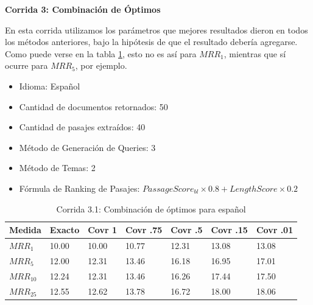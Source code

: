 \textbf{Corrida 3: Combinación de Óptimos}\newline

En esta corrida utilizamos los parámetros que mejores resultados dieron en todos los métodos anteriores, bajo la hipótesis de que el resultado debería agregarse. Como puede verse en la tabla \ref{table:optimos}, esto no es así para $MRR_1$, mientras que sí ocurre para $MRR_5$, por ejemplo. \newline


\begin{itemize}
  \item Idioma: Español
  \item Cantidad de documentos retornados: 50
  \item Cantidad de pasajes extraídos: 40
  \item Método de Generación de Queries: 3
  \item Método de Temas: 2
  \item Fórmula de Ranking de Pasajes:  $PassageScore_{bl} \times 0.8 + LengthScore \times 0.2$
\end{itemize}


\begin{table}[H]
\centering
\begin{center}
\begin{tabular}{|l | l | l | l | l | l | l |}
\hline
Medida & Exacto & Covr 1 & Covr .75 & Covr .5 & Covr .15 & Covr .01 \\ \hline
$MRR_{1}$ & 10.00 & 10.00 & 10.77 & 12.31 & 13.08 & 13.08  \\ \hline
$MRR_{5}$ & 12.00 & 12.31 & 13.46 & 16.18 & 16.95 & 17.01  \\ \hline
$MRR_{10}$ & 12.24 & 12.31 & 13.46 & 16.26 & 17.44 & 17.50  \\ \hline
$MRR_{25}$ & 12.55 & 12.62 & 13.78 & 16.72 & 18.00 & 18.06  \\ \hline
\end{tabular}
\label{table:optimos}

\medskip
\caption{Corrida 3.1: Combinación de óptimos para español}
\end{center}
\end{table}


